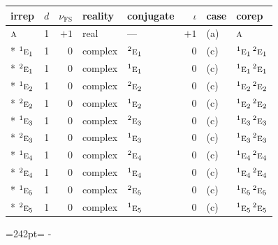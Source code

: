 \documentclass[10pt,a4paper]{article}
\newcommand{\needspace}[1]{\par\penalty-100\begingroup\dimen0=#1\relax\dimen2=\pagegoal
  \advance\dimen2-\pagetotal\ifdim\dimen0>\dimen2\relax\ifdim\dimen2>0pt\vfil\break\fi\fi
  \endgroup}
\numberwithin{equation}{section}
\newcommand{\irr}[1]{\text{\normalfont\scshape #1}}
\newcommand{\conjpair}[1]{{}^{#1}}
\newcommand{\fsind}{\nu_{\mathrm{FS}}}
\begin{document}
{\small\renewcommand{\arraystretch}{1.25}\setlength{\tabcolsep}{4pt}\begin{longtable}{@{}lrrllrll@{}}\toprule
irrep & $d$ & $\fsind$ & reality & conjugate & $\iota$ & case & corep\\\midrule\endhead
\bottomrule\endfoot\endlastfoot
$\irr{a}$ & 1 & $+1$ & real & --- & $+1$ & (a) & $\irr{a}$\\*
$\conjpair{1}\irr{e}_{1}$ & 1 & $0$ & complex & $\conjpair{2}\irr{e}_{1}$ & $0$ & (c) & $\conjpair{1}\irr{e}_{1}\,\conjpair{2}\irr{e}_{1}$\\*
$\conjpair{2}\irr{e}_{1}$ & 1 & $0$ & complex & $\conjpair{1}\irr{e}_{1}$ & $0$ & (c) & $\conjpair{1}\irr{e}_{1}\,\conjpair{2}\irr{e}_{1}$\\*
$\conjpair{1}\irr{e}_{2}$ & 1 & $0$ & complex & $\conjpair{2}\irr{e}_{2}$ & $0$ & (c) & $\conjpair{1}\irr{e}_{2}\,\conjpair{2}\irr{e}_{2}$\\*
$\conjpair{2}\irr{e}_{2}$ & 1 & $0$ & complex & $\conjpair{1}\irr{e}_{2}$ & $0$ & (c) & $\conjpair{1}\irr{e}_{2}\,\conjpair{2}\irr{e}_{2}$\\*
$\conjpair{1}\irr{e}_{3}$ & 1 & $0$ & complex & $\conjpair{2}\irr{e}_{3}$ & $0$ & (c) & $\conjpair{1}\irr{e}_{3}\,\conjpair{2}\irr{e}_{3}$\\*
$\conjpair{2}\irr{e}_{3}$ & 1 & $0$ & complex & $\conjpair{1}\irr{e}_{3}$ & $0$ & (c) & $\conjpair{1}\irr{e}_{3}\,\conjpair{2}\irr{e}_{3}$\\*
$\conjpair{1}\irr{e}_{4}$ & 1 & $0$ & complex & $\conjpair{2}\irr{e}_{4}$ & $0$ & (c) & $\conjpair{1}\irr{e}_{4}\,\conjpair{2}\irr{e}_{4}$\\*
$\conjpair{2}\irr{e}_{4}$ & 1 & $0$ & complex & $\conjpair{1}\irr{e}_{4}$ & $0$ & (c) & $\conjpair{1}\irr{e}_{4}\,\conjpair{2}\irr{e}_{4}$\\*
$\conjpair{1}\irr{e}_{5}$ & 1 & $0$ & complex & $\conjpair{2}\irr{e}_{5}$ & $0$ & (c) & $\conjpair{1}\irr{e}_{5}\,\conjpair{2}\irr{e}_{5}$\\*
$\conjpair{2}\irr{e}_{5}$ & 1 & $0$ & complex & $\conjpair{1}\irr{e}_{5}$ & $0$ & (c) & $\conjpair{1}\irr{e}_{5}\,\conjpair{2}\irr{e}_{5}$\\
\bottomrule\end{longtable}}
\needspace{242pt}
\end{document}
